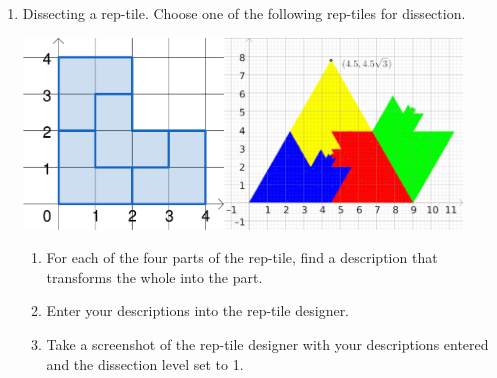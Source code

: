 \begin{enumerate}
\begin{enumerate}
\begin{enumerate}
\end{enumerate}

\item Dissecting a rep-tile. Choose one of the following rep-tiles for dissection.
\begin{center}
    \includegraphics[height=2in]{images/rep-tiles-25}\hspace{.5in}\includegraphics[height=2in]{images/rep-tiles-30}
\end{center}
\begin{enumerate}
\item For each of the four parts of the rep-tile, find a description that transforms the whole into the part.
\item Enter your descriptions into the rep-tile designer.
\item Take a screenshot of the rep-tile designer with your descriptions entered and the dissection level set to 1.
\end{enumerate}
\end{enumerate}
\end{enumerate}
